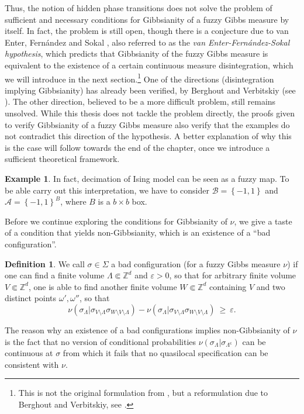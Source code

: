\documentclass[12pt]{article}
\newcommand{\A}{\mathcal{A}}
\newcommand{\B}{\mathcal{B}}
\newcommand{\Z}{\mathbb{Z}}
\newcommand{\set}[1]{\left\{#1\right\}}
\newcommand{\1}{\mathbbm{1}}
\renewcommand{\c}{\mathsf{c}}
\newcommand{\5}{\vspace{0.5cm}}
\theoremstyle{definition}
\newtheorem{ex}[thm]{Example}
\newtheorem{df}[thm]{Definition}
\begin{document}
Thus, the notion of hidden phase transitions does not solve the problem of sufficient and necessary conditions for Gibbsianity of a fuzzy Gibbs measure by itself. In fact, the problem is still open, though there is a conjecture due to van Enter, Fern\'andez and Sokal \cite{Ber}, also referred to as the \textit{van Enter-Fern\'andez-Sokal hypothesis}, which predicts that Gibbsianity of the fuzzy Gibbs measure is equivalent to the existence of a certain continuous measure disintegration, which we will introduce in the next section.\footnote{This is not the original formulation from \cite{EFS}, but a reformulation due to Berghout and Verbitskiy, see \cite{Ber}.} One of the directions (disintegration implying Gibbsianity) has already been verified, by Berghout and Verbitskiy (see \cite{Ber}). The other direction, believed to be a more difficult problem, still remains unsolved. While this thesis does not tackle the problem directly, the proofs given to verify Gibbsianity of a fuzzy Gibbs measure also verify that the examples do not contradict this direction of the hypothesis. A better explanation of why this is the case will follow towards the end of the chapter, once we introduce a sufficient theoretical framework. \\

\begin{ex}
In fact, decimation of Ising model can be seen as a fuzzy map. To be able carry out this interpretation, we have to consider $\B=\set{-1,1}$ and $\A=\set{-1,1}^{B}$, where $B$ is a $b\times b$ box.
\end{ex}

Before we continue exploring the conditions for Gibbsianity of $\nu$, we give a taste of a condition that yields non-Gibbsianity, which is an existence of a ``bad configuration''.

\begin{df}
We call $\sigma\in\Sigma$ a bad configuration (for a fuzzy Gibbs measure $\nu$) if one can find a finite volume $\Lambda\Subset\Z^d$ and $\varepsilon>0$, so that for arbitrary finite volume $V\Subset\Z^d$, one is able to find another finite volume $W\Subset\Z^d$ containing $V$ and two distinct points $\omega',\omega''$, so that
$$\nu(\sigma_\Lambda|\sigma_{V\setminus\Lambda}\sigma_{W\setminus V\setminus\Lambda})-\nu(\sigma_\Lambda|\sigma_{V\setminus\Lambda}\sigma_{W\setminus V\setminus\Lambda}) ~\geq~ \varepsilon.$$
\end{df}
The reason why an existence of a bad configurations implies non-Gibbsianity of $\nu$ is the fact that no version of conditional probabilities $\nu(\sigma_\Lambda|\sigma_{\Lambda^\c})$ can be continuous at $\sigma$ from which it fails that no quasilocal specification can be consistent with $\nu$.
\end{document}
